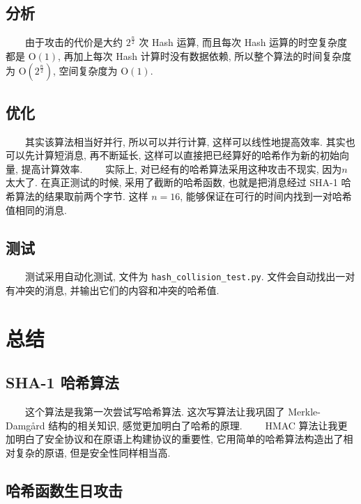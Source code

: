 \documentclass[12pt,a4paper]{article}
\begin{document}
\subsection*{分析}

　　由于攻击的代价是大约 $ 2^{\frac{n}{2}} $ 次 Hash 运算, 而且每次 Hash 运算的时空复杂度都是 $ \mathrm{O}(1) $, 再加上每次 Hash 计算时没有数据依赖, 所以整个算法的时间复杂度为 $ \mathrm{O}(2^\frac{n}{2}) $, 空间复杂度为 $ \mathrm{O}(1) $. 

\subsection*{优化}

　　其实该算法相当好并行, 所以可以并行计算, 这样可以线性地提高效率. 其实也可以先计算短消息, 再不断延长, 这样可以直接把已经算好的哈希作为新的初始向量, 提高计算效率. 
\newline
　　实际上, 对已经有的哈希算法采用这种攻击不现实, 因为$ n $ 太大了. 在真正测试的时候, 采用了截断的哈希函数, 也就是把消息经过 SHA-1 哈希算法的结果取前两个字节. 这样 $ n = 16 $, 能够保证在可行的时间内找到一对哈希值相同的消息. 

\subsection*{测试}

　　测试采用自动化测试, 文件为 \verb|hash_collision_test.py|. 文件会自动找出一对有冲突的消息, 并输出它们的内容和冲突的哈希值. 

\section*{总结}

\subsection*{SHA-1 哈希算法}

　　这个算法是我第一次尝试写哈希算法. 这次写算法让我巩固了 Merkle-Damgård 结构的相关知识, 感觉更加明白了哈希的原理. 
\newline
　　HMAC 算法让我更加明白了安全协议和在原语上构建协议的重要性, 它用简单的哈希算法构造出了相对复杂的原语, 但是安全性同样相当高. 

\subsection*{哈希函数生日攻击}
\end{document}
